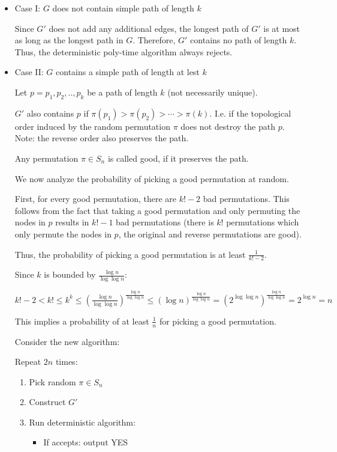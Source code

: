\begin{itemize}
    \item Case I: $G$ does not contain simple path of length $k$ 
    
    Since $G'$ does not add any additional edges, the longest path of $G'$ is at most as long as the longest path in $G$. Therefore, $G'$ contains no path of length $k$. Thus, the deterministic poly-time algorithm always rejects.
    
    \item Case II: $G$ contains a simple path of length at lest $k$
    
    Let $p = p_1,p_2,..,p_k$ be a path of length $k$ (not necessarily unique). 
    
    $G'$ also contains $p$ if $\pi(p_1) > \pi(p_2) > \cdots > \pi(k)$. I.e. if the topological order induced by the random permutation $\pi$ does not destroy the path $p$. Note: the reverse order also preserves the path.
    
    Any permutation $\pi \in S_n$ is called good, if it preserves the path. 
    
    We now analyze the probability of picking a good permutation at random.
    
    First, for every good permutation, there are $k! - 2$ bad permutations. This follows from the fact that taking a good permutation and only permuting the nodes in $p$ results in $k! - 1$ bad permutations (there is $k!$ permutations which only permute the nodes in $p$, the original and reverse permutations are good). 
    
    Thus, the probability of picking a good permutation is at least $\frac{1}{k! - 2}$.
    
    Since $k$ is bounded by $\frac{\log n}{\log \log n}$:
    
    $k! - 2 < 
    k! \leq 
    k^k \leq 
    \left(\frac{\log n}{\log \log n}\right)^{\frac{\log n}{\log \log n}} \leq 
    \left(\log n\right)^{\frac{\log n}{\log \log n}} =
    \left(2^{\log \log n}\right)^{\frac{\log n}{\log \log n}} = 
    2^{\log n} = 
    n$
    
    This implies a probability of at least $\frac{1}{n}$ for picking a good permutation. 
    
    Consider the new algorithm:
    
    Repeat $2n$ times:
    \begin{enumerate}
        \item Pick random $\pi \in S_n$
        \item Construct $G'$
        \item Run deterministic algorithm:
        \begin{itemize}
            \item If accepts: output YES
        \end{itemize}
        

\end{enumerate}
\end{itemize}
